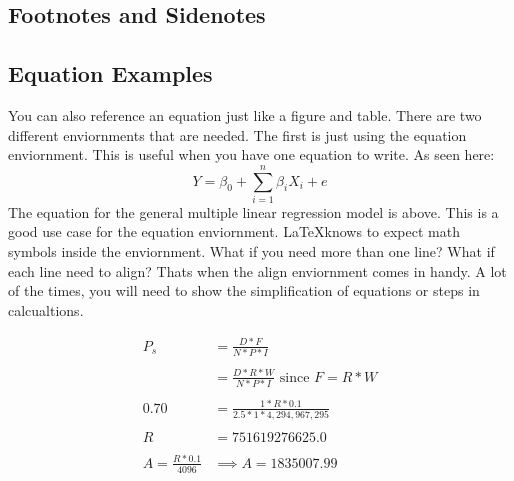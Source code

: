 \documentclass[./dissertation.tex]{subfiles}
\begin{document}
      \subsection{Footnotes and Sidenotes}
      


      \subsection{Equation Examples}
        You can also reference an equation just like a figure and table. There are two different enviornments that are needed. The first is just using the equation enviornment. This is useful when you have one equation to write. As seen here:
          \begin{equation*}
            Y=\beta_{0} + \sum\limits_{i=1}^n \beta_{i}X_{i} + e
          \end{equation*}
        The equation for the general multiple linear regression model is above. This is a good use case for the equation enviornment. \LaTeX knows to expect math symbols inside the enviornment. What if you need more than one line? What if each line need to align? Thats when the align enviornment comes in handy. A lot of the times, you will need to show the simplification of equations or steps in calcualtions.
          \begin{center}
            \begin{align*}
              P_{s} &= \frac{D*F}{N*P*I}\\
                            \\
              &= \frac{D*R*W}{N*P*I} \text{  since } F=R*W\\
                      \\
              0.70 &= \frac{1*R*0.1}{2.5*1*4,294,967,295}\\
                      \\
             R &= 751619276625.0 \\
             \\
             A=\frac{R*0.1}{4096} &\implies A = 1835007.99
           \end{align*}
         \end{center}
\end{document}
